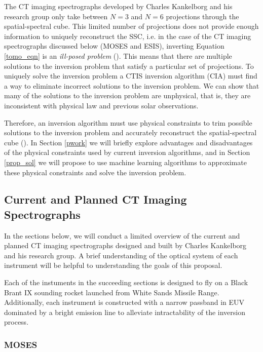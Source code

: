 \documentclass[10pt, letter]{article}
\begin{document}
			The CT imaging spectrographs developed by Charles Kankelborg and his research group only take between $N=3$ and $N=6$ projections through the spatial-spectral cube. This limited number of projections does not provide enough information to uniquely reconstruct the SSC, i.e. in the case of the CT imaging spectrographs discussed below (MOSES and ESIS), inverting Equation \ref{tomo_eqn} is an \textit{ill-posed problem} (\cite{inversion}). This means that there are multiple solutions to the inversion problem that satisfy a particular set of projections. To uniquely solve the inversion problem a CTIS inversion algorithm (CIA) must find a way to eliminate incorrect solutions to the inversion problem. We can show that many of the solutions to the inversion problem are unphysical, that is, they are inconsistent with physical law and previous solar observations.
			
			Therefore, an inversion algorithm must use physical constraints to trim possible solutions to the inversion problem and accurately reconstruct the spatial-spectral cube (\cite{inversion}). In Section \ref{pwork} we will briefly explore advantages and disadvantages of the physical constraints used by current inversion algorithms, and in Section \ref{prop_sol} we will propose to use machine learning algorithms to approximate these physical constraints and solve the inversion problem.
			
		\subsection{Current and Planned CT Imaging Spectrographs}

			In the sections below, we will conduct a limited overview of the current and planned CT imaging spectrographs designed and built by Charles Kankelborg and his research group. A brief understanding of the optical system of each instrument will be helpful to understanding the goals of this proposal. 

			Each of the instuments in the succeeding sections is designed to fly on a Black Brant IX sounding rocket launched from White Sands Missile Range. Additionally, each instrument is constructed with a narrow passband in EUV dominated by a bright emission line to alleviate intractability of the inversion process.

			\subsubsection{MOSES} \label{moses_intro}
\end{document}
